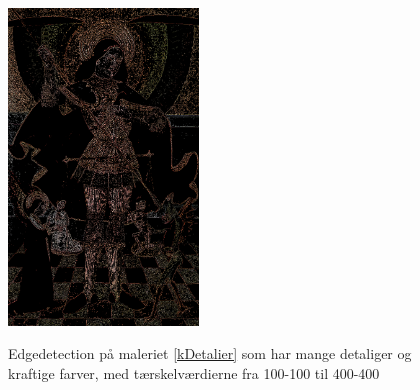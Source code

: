 \begin{figure}[p]
{        \includegraphics[angle=0,width=0.45\textwidth]{afsnit/afprovning/billeder/thressholds/krafitige_farver/krafite_detalier/1_iteration/300-300.png}
        \label{300-300}}\hspace{1em}
    \label{allesammen1}
    \caption{Edgedetection på maleriet \ref{kDetalier} som har mange detaliger og kraftige farver, med tærskelværdierne fra 100-100 til 400-400}
\end{figure}

\clearpage

